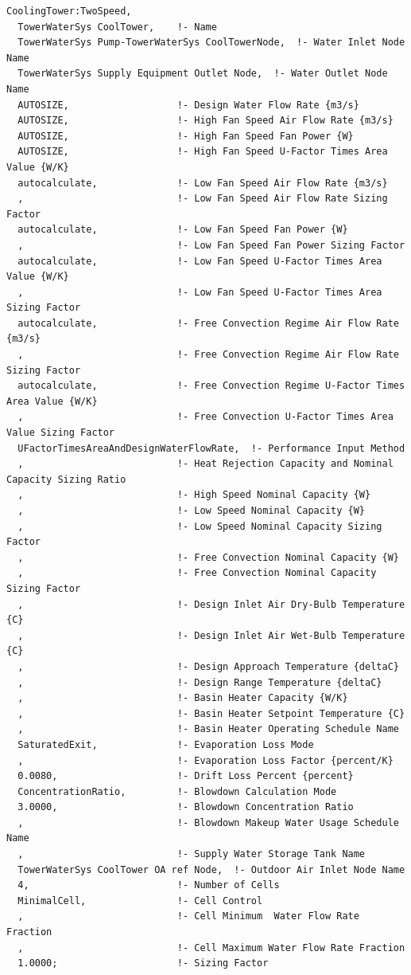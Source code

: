 \begin{lstlisting}
CoolingTower:TwoSpeed,
  TowerWaterSys CoolTower,    !- Name
  TowerWaterSys Pump-TowerWaterSys CoolTowerNode,  !- Water Inlet Node Name
  TowerWaterSys Supply Equipment Outlet Node,  !- Water Outlet Node Name
  AUTOSIZE,                   !- Design Water Flow Rate {m3/s}
  AUTOSIZE,                   !- High Fan Speed Air Flow Rate {m3/s}
  AUTOSIZE,                   !- High Fan Speed Fan Power {W}
  AUTOSIZE,                   !- High Fan Speed U-Factor Times Area Value {W/K}
  autocalculate,              !- Low Fan Speed Air Flow Rate {m3/s}
  ,                           !- Low Fan Speed Air Flow Rate Sizing Factor
  autocalculate,              !- Low Fan Speed Fan Power {W}
  ,                           !- Low Fan Speed Fan Power Sizing Factor
  autocalculate,              !- Low Fan Speed U-Factor Times Area Value {W/K}
  ,                           !- Low Fan Speed U-Factor Times Area Sizing Factor
  autocalculate,              !- Free Convection Regime Air Flow Rate {m3/s}
  ,                           !- Free Convection Regime Air Flow Rate Sizing Factor
  autocalculate,              !- Free Convection Regime U-Factor Times Area Value {W/K}
  ,                           !- Free Convection U-Factor Times Area Value Sizing Factor
  UFactorTimesAreaAndDesignWaterFlowRate,  !- Performance Input Method
  ,                           !- Heat Rejection Capacity and Nominal Capacity Sizing Ratio
  ,                           !- High Speed Nominal Capacity {W}
  ,                           !- Low Speed Nominal Capacity {W}
  ,                           !- Low Speed Nominal Capacity Sizing Factor
  ,                           !- Free Convection Nominal Capacity {W}
  ,                           !- Free Convection Nominal Capacity Sizing Factor
  ,                           !- Design Inlet Air Dry-Bulb Temperature {C}
  ,                           !- Design Inlet Air Wet-Bulb Temperature {C}
  ,                           !- Design Approach Temperature {deltaC}
  ,                           !- Design Range Temperature {deltaC}
  ,                           !- Basin Heater Capacity {W/K}
  ,                           !- Basin Heater Setpoint Temperature {C}
  ,                           !- Basin Heater Operating Schedule Name
  SaturatedExit,              !- Evaporation Loss Mode
  ,                           !- Evaporation Loss Factor {percent/K}
  0.0080,                     !- Drift Loss Percent {percent}
  ConcentrationRatio,         !- Blowdown Calculation Mode
  3.0000,                     !- Blowdown Concentration Ratio
  ,                           !- Blowdown Makeup Water Usage Schedule Name
  ,                           !- Supply Water Storage Tank Name
  TowerWaterSys CoolTower OA ref Node,  !- Outdoor Air Inlet Node Name
  4,                          !- Number of Cells
  MinimalCell,                !- Cell Control
  ,                           !- Cell Minimum  Water Flow Rate Fraction
  ,                           !- Cell Maximum Water Flow Rate Fraction
  1.0000;                     !- Sizing Factor
\end{lstlisting}

